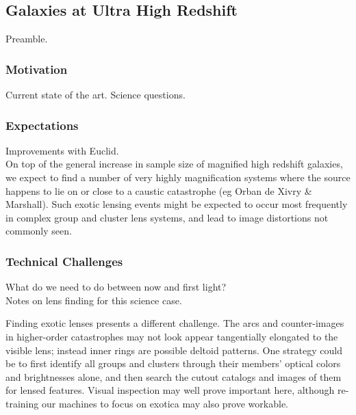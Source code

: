 \documentclass[twocolumn]{svjour3}
\begin{document}

\subsection{Galaxies at Ultra High Redshift}



Preamble.

\subsubsection{Motivation}
Current state of the art. Science questions.\\

\subsubsection{Expectations}

Improvements with Euclid.\\

On top of the general increase in sample size of magnified high redshift
galaxies, we expect to find a number of very highly magnification
systems where the source happens to lie on or close to a caustic
catastrophe (eg Orban de Xivry \& Marshall). Such exotic lensing events
might be expected to occur most frequently in complex group and cluster
lens systems, and lead to image distortions not commonly seen.

\subsubsection{Technical Challenges}

What do we need to do between now and first light?\\

Notes on lens finding for this science case.

Finding exotic lenses presents a different challenge. The arcs and
counter-images in higher-order catastrophes may not look appear
tangentially elongated to the visible lens; instead inner rings are
possible deltoid patterns. One strategy could be to first identify all
groups and clusters through their members' optical colors and
brightnesses alone, and then search the cutout catalogs and images of
them for lensed features. Visual inspection may well prove important
here, although re-training our machines to focus on exotica may also
prove workable.
\end{document}
